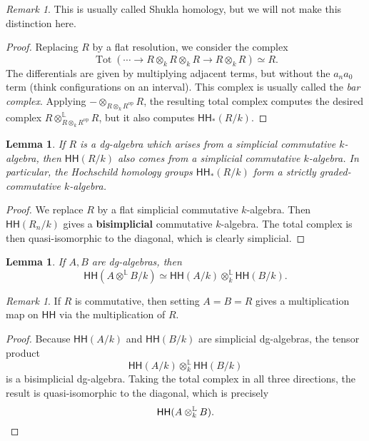 \documentclass[10pt]{amsart}
\newtheorem{lem}[thm]{Lemma}
\theoremstyle{definition}
\theoremstyle{remark}
\newtheorem{rmk}[thm]{Remark}
\theoremstyle{plain}
\theoremstyle{definition}
\theoremstyle{remark}
\renewcommand{\L}{\mathbb{L}}
\newcommand{\ms}[1]{\mathsf{#1}}
\newcommand{\1}{\mathbf{1}}
\newcommand{\2}{\mathbf{2}}
\newcommand{\3}{\mathbf{3}}
\newcommand{\HH}{\ms{HH}}
\DeclareMathOperator{\op}{op}
\DeclareMathOperator{\Tot}{Tot}
\begin{document}
\begin{rmk}
    This is usually called Shukla homology, but we will not make this distinction here.
\end{rmk}

\begin{proof}
    Replacing $R$ by a flat resolution, we consider the complex
    \[ \Tot(\cdots \to R \otimes_k R \otimes_k R \to R \otimes_k R) \simeq R. \]
    The differentials are given by multiplying adjacent terms, but without the $a_n a_0$ term (think configurations on an interval). This complex is usually called the \textit{bar complex}. Applying $- \otimes_{R \otimes_k R^{\op}} R$, the resulting total complex computes the desired complex $R \otimes_{R \otimes_k R^{\op}}^{\L} R$, but it also computes $\HH_*(R/k)$.
\end{proof}

\begin{lem}
    If $R$ is a dg-algebra which arises from a simplicial commutative $k$-algebra, then $\HH(R/k)$ also comes from a simplicial commutative $k$-algebra. In particular, the Hochschild homology groups $\HH_*(R/k)$ form a strictly graded-commutative $k$-algebra.
\end{lem}

\begin{proof}
    We replace $R$ by a flat simplicial commutative $k$-algebra. Then $\HH(R_n/k)$ gives a \textbf{bisimplicial} commutative $k$-algebra. The total complex is then quasi-isomorphic to the diagonal, which is clearly simplicial.
\end{proof}

\begin{lem}
    If $A, B$ are dg-algebras, then
    \[ \HH(A \otimes^{\L} B/k) \simeq \HH(A/k) \otimes_k^{\L} \HH(B/k). \]
\end{lem}

\begin{rmk}
    If $R$ is commutative, then setting $A=B=R$ gives a multiplication map on $\HH$ via the multiplication of $R$.
\end{rmk}

\begin{proof}
    Because $\HH(A/k)$ and $\HH(B/k)$ are simplicial dg-algebras, the tensor product
    \[ \HH(A/k) \otimes_k^{\L} \HH(B/k) \]
    is a bisimplicial dg-algebra. Taking the total complex in all three directions, the result is quasi-isomorphic to the diagonal, which is precisely
    \[ \HH(A\otimes_k^{\L} B). \qedhere \]
\end{proof}
\end{document}
